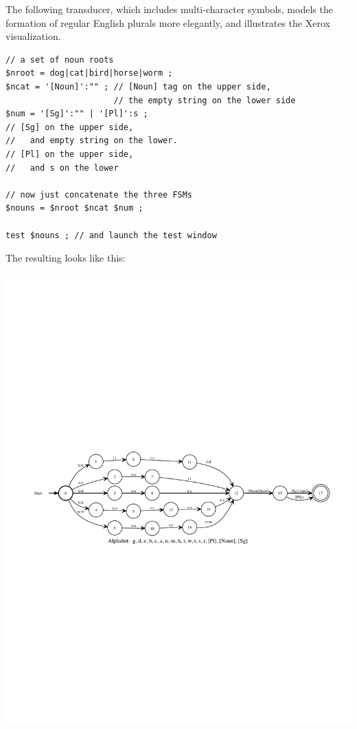 The following transducer, which includes multi-character symbols,
models the formation of regular English plurals more elegantly, and illustrates the Xerox
visualization.

\begin{Verbatim}
// a set of noun roots
$nroot = dog|cat|bird|horse|worm ;
$ncat = '[Noun]':"" ; // [Noun] tag on the upper side,
                      // the empty string on the lower side
$num = '[Sg]':"" | '[Pl]':s	; 
// [Sg] on the upper side, 
//   and empty string on the lower.
// [Pl] on the upper side, 
//   and s on the lower

// now just concatenate the three FSMs
$nouns = $nroot $ncat $num ;

test $nouns ; // and launch the test window
\end{Verbatim}

\noindent
The resulting \fst{} looks like this:

\begin{center}
\includegraphics[width=135mm]{images/simplenounsgpl.pdf}
\end{center}


